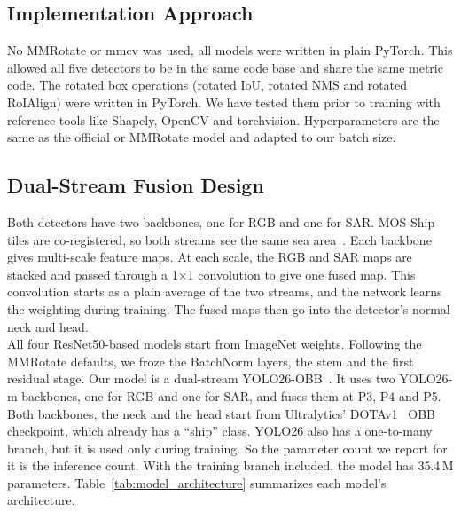 \subsection{Implementation Approach}No MMRotate or mmcv was used, all models were written in plain PyTorch. This allowed all five detectors to be in the same code base and share the same metric code. The rotated box operations (rotated IoU, rotated NMS and rotated RoIAlign) were written in PyTorch. We have tested them prior to training with reference tools like Shapely, OpenCV and torchvision. Hyperparameters are the same as the official or MMRotate model and adapted to our batch size.
\\

\subsection{Dual-Stream Fusion Design}
Both detectors have two backbones, one for RGB and one for SAR. MOS-Ship tiles are co-registered, so both streams see the same sea area~\cite{you2026multi}. Each backbone gives multi-scale feature maps. At each scale, the RGB and SAR maps are stacked and passed through a 1×1 convolution to give one fused map. This convolution starts as a plain average of the two streams, and the network learns the weighting during training. The fused maps then go into the detector's normal neck and head.\\

All four ResNet50-based models start from ImageNet weights. Following the MMRotate defaults, we froze the BatchNorm layers, the stem and the first residual stage. Our model is a dual-stream YOLO26-OBB~\cite{jocher2026ultralytics}. It uses two YOLO26-m backbones, one for RGB and one for SAR, and fuses them at P3, P4 and P5. Both backbones, the neck and the head start from Ultralytics' DOTAv1~\cite{xia2018dota} OBB checkpoint, which already has a ``ship'' class. YOLO26 also has a one-to-many branch, but it is used only during training. So the parameter count we report for it is the inference count. With the training branch included, the model has 35.4\,M parameters. Table~\ref{tab:model_architecture} summarizes each model's architecture.

